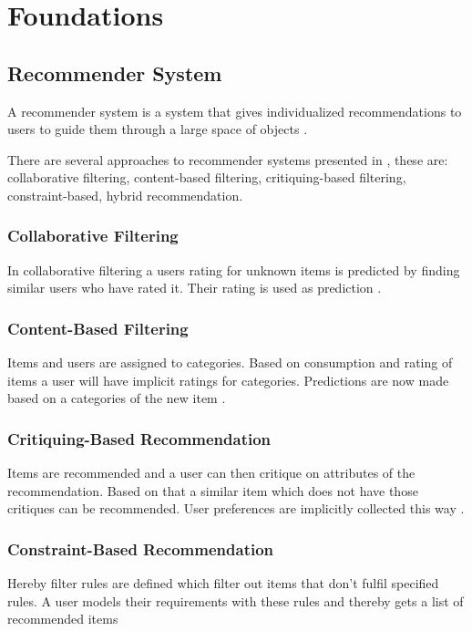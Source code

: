 \chapter{Foundations}
\label{ch:Foundations}

\section{Recommender System}
\label{sec:Foundations:RecommenderSystem}

A recommender system is a system that gives individualized recommendations to users to guide them through a large space of objects \cite[~ p. 331]{burkeHybridRecommenderSystems2002}.

There are several approaches to recommender systems presented in \cite{felfernigGroupRecommenderSystems2018}, these are: collaborative filtering, content-based filtering, critiquing-based filtering, constraint-based, hybrid recommendation.

\subsection{Collaborative Filtering}
In collaborative filtering a users rating for unknown items is predicted by finding similar users who have rated it. Their rating is used as prediction
\cite[~ pp. 7, 8]{felfernigDecisionTasksBasic2018}.

\subsection{Content-Based Filtering}
Items and users are assigned to categories. Based on consumption and rating of items a user will have implicit ratings for categories. Predictions are now made based on a categories of the new item \cite[~ pp. 10, 11]{felfernigDecisionTasksBasic2018}.

\subsection{Critiquing-Based Recommendation}
Items are recommended and a user can then critique on attributes of the recommendation. Based on that a similar item which does not have those critiques can be recommended. User preferences are implicitly collected this way \cite{knijnenburgEachHisOwn2011}.

\subsection{Constraint-Based Recommendation}
Hereby filter rules are defined which filter out items that don't fulfil specified rules. A user models their requirements with these rules and thereby gets a list of recommended items \cite[~ p. 12]{felfernigDecisionTasksBasic2018}

